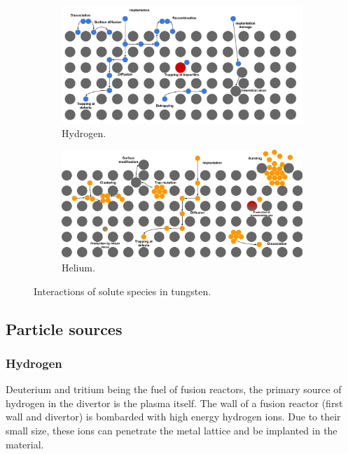 \begin{figure}[h!]
    \begin{subfigure}{0.9\linewidth}
        \includegraphics[width=\linewidth]{Figures/Chapter1/HI transport sketch.pdf}
        \caption{Hydrogen.}
    \end{subfigure}
    \begin{subfigure}{0.9\linewidth}
        \includegraphics[width=\linewidth]{Figures/Chapter1/He transport sketch.pdf}
        \caption{Helium.}
    \end{subfigure}
    \caption{Interactions of solute species in tungsten.}
\end{figure}

\subsection{Particle sources}

\subsubsection{Hydrogen}
Deuterium and tritium being the fuel of fusion reactors, the primary source of hydrogen in the \gls{divertor} is the \gls{plasma} itself.
The wall of a fusion reactor (\gls{first wall} and \gls{divertor}) is bombarded with high energy hydrogen ions.
Due to their small size, these ions can penetrate the metal \gls{lattice} and be implanted in the material.


